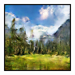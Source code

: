 \documentclass{article}
\begin{document}
\begin{figure}[H]
\begin{subfigure}{.165\textwidth}
        \includegraphics[width=0.75\linewidth]{output_1_modified_cycle_gan.png}
    \end{subfigure}
    

\end{figure}
\end{document}
